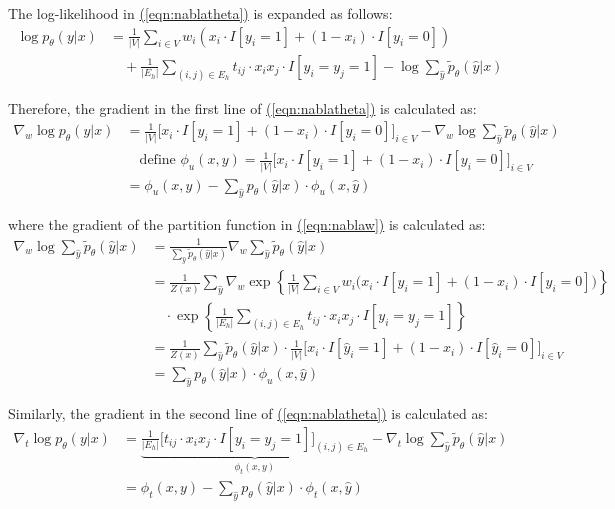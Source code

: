 \documentclass[11pt,a4paper]{book}
\begin{document}
The log-likelihood in \hyperref[eqn:nablatheta]{(\ref{eqn:nablatheta})} is expanded as follows:
\begin{align}
\log p_\theta(y|x)&=\frac{1}{|V|}\sum_{i\in V}w_i(x_i\cdot I[y_i=1]+(1-x_i)\cdot I[y_i=0])\nonumber\\
&\quad+\frac{1}{|E_h|}\sum_{(i,j)\in E_h}t_{ij}\cdot x_ix_j\cdot I[y_i=y_j=1]-\log\sum_{\hat{y}}\tilde{p}_\theta(\hat{y}|x)
\end{align}

Therefore, the gradient in the first line of \hyperref[eqn:nablatheta]{(\ref{eqn:nablatheta})} is calculated as:
\begin{align}
\nabla_w\log p_\theta(y|x)&=\frac{1}{|V|}\Big[x_i\cdot I[y_i=1]+(1-x_i)\cdot I[y_i=0]\Big]_{i\in V}-\nabla_w\log\sum_{\hat{y}}\tilde{p}_\theta(\hat{y}|x)\nonumber\\
&\quad\text{define }\phi_u(x,y)=\frac{1}{|V|}\Big[x_i\cdot I[y_i=1]+(1-x_i)\cdot I[y_i=0]\Big]_{i\in V}\nonumber\\
&=\phi_u(x,y)-\sum_{\hat{y}}p_\theta(\hat{y}|x)\cdot\phi_u(x,\hat{y})
\label{eqn:nablaw}
\end{align}

where the gradient of the partition function in \hyperref[eqn:nablaw]{(\ref{eqn:nablaw})} is calculated as:
\begin{align}
\nabla_w\log\sum_{\hat{y}}\tilde{p}_\theta(\hat{y}|x)&=\frac{1}{\sum_{\hat{y}}\tilde{p}_\theta(\hat{y}|x)}\nabla_w\sum_{\hat{y}}\tilde{p}_\theta(\hat{y}|x)\nonumber\\
&=\frac{1}{Z(x)}\sum_{\hat{y}}\nabla_w\exp\left\{\frac{1}{|V|}\sum_{i\in V}w_i\big(x_i\cdot I[y_i=1]+(1-x_i)\cdot I[y_i=0]\big)\right\}\nonumber\\
&\quad\cdot\exp\left\{\frac{1}{|E_h|}\sum_{(i,j)\in E_h}t_{ij}\cdot x_ix_j\cdot I[y_i=y_j=1]\right\}\nonumber\\
&=\frac{1}{Z(x)}\sum_{\hat{y}}\tilde{p}_\theta(\hat{y}|x)\cdot\frac{1}{|V|}\Big[x_i\cdot I[\hat{y}_i=1]+(1-x_i)\cdot I[\hat{y}_i=0]\Big]_{i\in V}\nonumber\\
&=\sum_{\hat{y}}p_\theta(\hat{y}|x)\cdot\phi_u(x,\hat{y})
\end{align}

Similarly, the gradient in the second line of \hyperref[eqn:nablatheta]{(\ref{eqn:nablatheta})} is calculated as:
\begin{align}
\nabla_t\log p_\theta(y|x)&=\underbrace{\frac{1}{|E_h|}\Big[t_{ij}\cdot x_ix_j\cdot I[y_i=y_j=1]\Big]_{(i,j)\in E_h}}_{\phi_t(x,y)}-\nabla_t\log\sum_{\hat{y}}\tilde{p}_\theta(\hat{y}|x)\nonumber\\
&=\phi_t(x,y)-\sum_{\hat{y}}p_\theta(\hat{y}|x)\cdot\phi_t(x,\hat{y})
\label{eqn:nablat}
\end{align}
\end{document}
